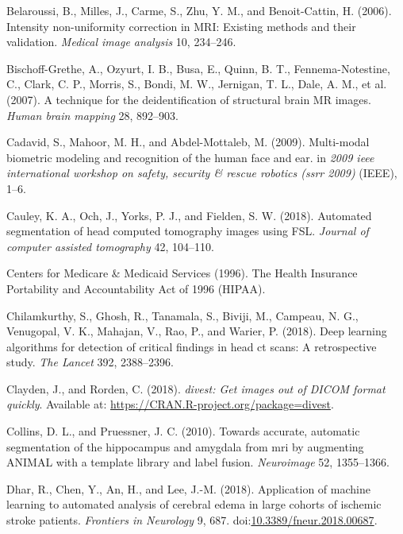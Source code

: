 \documentclass[utf8]{frontiersSCNS}
\begin{document}
\leavevmode\hypertarget{ref-belaroussi2006intensity}{}%
Belaroussi, B., Milles, J., Carme, S., Zhu, Y. M., and Benoit-Cattin, H. (2006). Intensity non-uniformity correction in MRI: Existing methods and their validation. \emph{Medical image analysis} 10, 234--246.

\leavevmode\hypertarget{ref-mridefacer}{}%
Bischoff-Grethe, A., Ozyurt, I. B., Busa, E., Quinn, B. T., Fennema-Notestine, C., Clark, C. P., Morris, S., Bondi, M. W., Jernigan, T. L., Dale, A. M., et al. (2007). A technique for the deidentification of structural brain MR images. \emph{Human brain mapping} 28, 892--903.

\leavevmode\hypertarget{ref-cadavid2009multi}{}%
Cadavid, S., Mahoor, M. H., and Abdel-Mottaleb, M. (2009). Multi-modal biometric modeling and recognition of the human face and ear. in \emph{2009 ieee international workshop on safety, security \& rescue robotics (ssrr 2009)} (IEEE), 1--6.

\leavevmode\hypertarget{ref-biasct}{}%
Cauley, K. A., Och, J., Yorks, P. J., and Fielden, S. W. (2018). Automated segmentation of head computed tomography images using FSL. \emph{Journal of computer assisted tomography} 42, 104--110.

\leavevmode\hypertarget{ref-hipaa}{}%
Centers for Medicare \& Medicaid Services (1996). The Health Insurance Portability and Accountability Act of 1996 (HIPAA).

\leavevmode\hypertarget{ref-cq500}{}%
Chilamkurthy, S., Ghosh, R., Tanamala, S., Biviji, M., Campeau, N. G., Venugopal, V. K., Mahajan, V., Rao, P., and Warier, P. (2018). Deep learning algorithms for detection of critical findings in head ct scans: A retrospective study. \emph{The Lancet} 392, 2388--2396.

\leavevmode\hypertarget{ref-divest}{}%
Clayden, J., and Rorden, C. (2018). \emph{divest: Get images out of DICOM format quickly}. Available at: \url{https://CRAN.R-project.org/package=divest}.

\leavevmode\hypertarget{ref-collins2010towards}{}%
Collins, D. L., and Pruessner, J. C. (2010). Towards accurate, automatic segmentation of the hippocampus and amygdala from mri by augmenting ANIMAL with a template library and label fusion. \emph{Neuroimage} 52, 1355--1366.

\leavevmode\hypertarget{ref-csfedema}{}%
Dhar, R., Chen, Y., An, H., and Lee, J.-M. (2018). Application of machine learning to automated analysis of cerebral edema in large cohorts of ischemic stroke patients. \emph{Frontiers in Neurology} 9, 687. doi:\href{https://doi.org/10.3389/fneur.2018.00687}{10.3389/fneur.2018.00687}.
\end{document}
